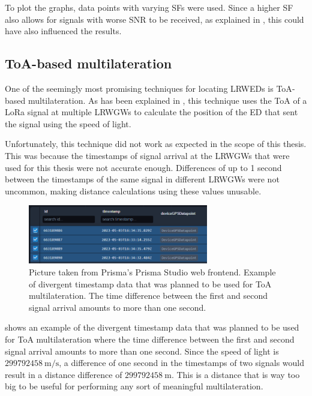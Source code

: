 To plot the graphs, data points with varying \acp{SF} were used.
Since a higher \ac{SF} also allows for signals with worse \ac{SNR} to be received, as explained in , this could have also influenced the results.

\subsection{\acf{ToA}-based multilateration}\label{subsec:toa-based-multilateration-implementation}

One of the seemingly most promising techniques for locating \aclp{LRWED} is \ac{ToA}-based multilateration.
As has been explained in , this technique uses the \acl{ToA} of a \ac{LoRa} signal at multiple \aclp{LRWGW} to calculate the position of the \acl{ED} that sent the signal using the speed of light.

Unfortunately, this technique did not work as expected in the scope of this thesis.
This was because the timestamps of signal arrival at the \aclp{LRWGW} that were used for this thesis were not accurate enough.
Differences of up to 1 second between the timestamps of the same signal in different \aclp{LRWGW} were not uncommon, making distance calculations using these values unusable.

\begin{figure}[htbp]
    \centering
    \includegraphics[width=0.7\textwidth]{pictures/multilateration/toa_bad_data_example_prisma_studio.png}
    \caption[Example of divergent timestamp data that was planned to be used for \acl{ToA} multilateration]{
        Picture taken from Prisma's Prisma Studio web frontend.
        Example of divergent timestamp data that was planned to be used for \ac{ToA} multilateration.
        The time difference between the first and second signal arrival amounts to more than one second.
    }\label{fig:toa-bad-data-example}
\end{figure}

 shows an example of the divergent timestamp data that was planned to be used for \ac{ToA} multilateration where the time difference between the first and second signal arrival amounts to more than one second.
Since the speed of light is $299792458\ \mathrm{m/s}$, a difference of one second in the timestamps of two signals would result in a distance difference of $299792458\ \mathrm{m}$.
This is a distance that is way too big to be useful for performing any sort of meaningful multilateration.

